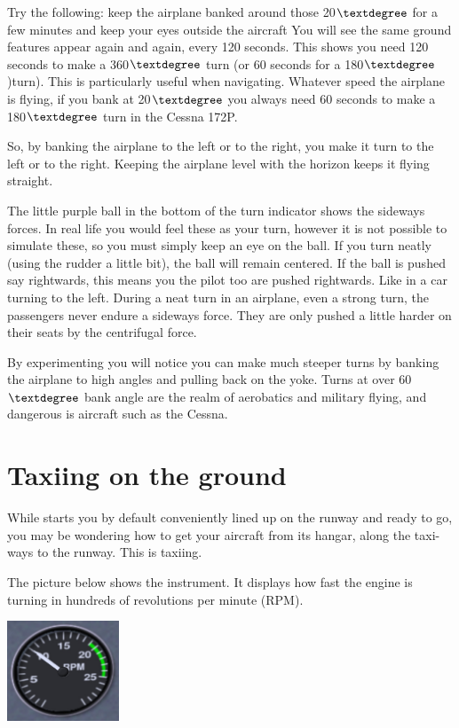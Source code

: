 \begin{itemize}
Try the following: keep the airplane banked around those 20$\textdegree$ for a
few minutes and keep your eyes outside the aircraft You will see the same
ground features appear again and again, every 120 seconds. This shows you
need 120 seconds to make a 360$\textdegree$ turn (or 60 seconds for a
180$\textdegree$)turn). This is particularly useful when navigating.
Whatever speed the airplane is flying, if you bank at 20$\textdegree$ you
always need 60 seconds to make a 180$\textdegree$ turn in the Cessna 172P.

So, by banking the airplane to the left or to the right, you make it turn to
the left or to the right. Keeping the airplane level with the horizon keeps
it flying straight.

The little purple ball in the bottom of the turn indicator
shows the sideways forces. In real life you would feel these as your turn,
however it is not possible to simulate these, so you must simply keep an eye
on the ball. If you turn neatly (using the rudder a little bit),
the ball will remain centered. If the ball is pushed say rightwards, this
means you the pilot too are pushed rightwards. Like in a car turning to the
left. During a neat turn in an airplane, even a strong turn, the passengers
never endure a sideways force. They are only pushed a little harder on their
seats by the centrifugal force.

By experimenting you will notice you can make much steeper turns by
banking the airplane to high angles and pulling back on the yoke. Turns at over
60$\textdegree$ bank angle are the realm of aerobatics and military flying, and
dangerous is aircraft such as the Cessna.

\section{Taxiing on the ground}
\label{sec:TaxiTurning}

While \FlightGear{} starts you by default conveniently lined up on the
runway and ready to go, you may be wondering how to get your aircraft from
its hangar, along the taxi-ways to the runway. This is taxiing.

The picture below shows the  instrument. It displays how fast
the engine is turning in hundreds of revolutions per minute (RPM).

\begin{center}
\includegraphics[width=0.25\textwidth]{img/tut_20}
\end{center}


\end{itemize}
